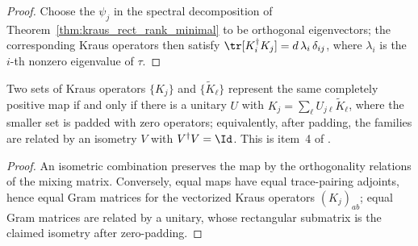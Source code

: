 \begin{proof}
    \leanok
    Choose the $\psi_j$ in the spectral decomposition of
    Theorem~\ref{thm:kraus_rect_rank_minimal} to be orthogonal
    eigenvectors; the corresponding Kraus operators then satisfy
    $\tr[K_i^\dagger K_j]=d\,\lambda_i\,\delta_{ij}$, where $\lambda_i$ is
    the $i$-th nonzero eigenvalue of $\tau$.
\end{proof}

\begin{theorem}
    \label{thm:kraus_rect_freedom}
    \leanok
    Two sets of Kraus operators $\{K_j\}$ and $\{\widetilde{K}_\ell\}$
    represent the same completely positive map if and only if there is a
    unitary $U$ with $K_j=\sum_\ell U_{j\ell}\widetilde{K}_\ell$, where the
    smaller set is padded with zero operators; equivalently, after padding,
    the families are related by an isometry $V$ with $V^\dagger V=\Id$.
    This is item~4 of \cite[Theorem~2.1]{Wolf2012Quantum}.
\end{theorem}

\begin{proof}
    \leanok
    An isometric combination preserves the map by the orthogonality
    relations of the mixing matrix. Conversely, equal maps have equal
    trace-pairing adjoints, hence equal Gram matrices
    for the vectorized Kraus operators $(K_j)_{ab}$; equal Gram matrices
    are related by a unitary, whose rectangular submatrix is the claimed
    isometry after zero-padding.
\end{proof}
